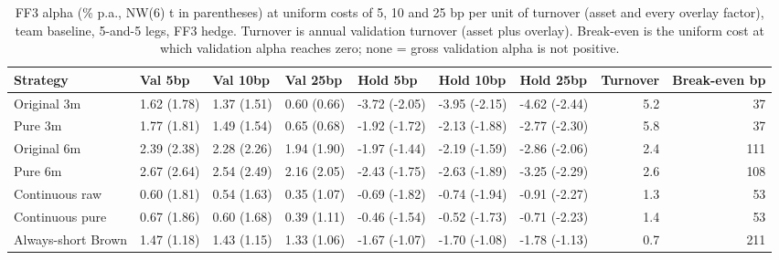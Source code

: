 \begin{table}
\caption{FF3 alpha (\% p.a., NW(6) t in parentheses) at uniform costs of 5, 10 and 25 bp per unit of turnover (asset and every overlay factor), team baseline, 5-and-5 legs, FF3 hedge. Turnover is annual validation turnover (asset plus overlay). Break-even is the uniform cost at which validation alpha reaches zero; none = gross validation alpha is not positive.}
\label{tab:m2_costs_team}
\begin{tabular}{lllllllrr}
\toprule
Strategy & Val 5bp & Val 10bp & Val 25bp & Hold 5bp & Hold 10bp & Hold 25bp & Turnover & Break-even bp \\
\midrule
Original 3m & 1.62 (1.78) & 1.37 (1.51) & 0.60 (0.66) & -3.72 (-2.05) & -3.95 (-2.15) & -4.62 (-2.44) & 5.2 & 37 \\
Pure 3m & 1.77 (1.81) & 1.49 (1.54) & 0.65 (0.68) & -1.92 (-1.72) & -2.13 (-1.88) & -2.77 (-2.30) & 5.8 & 37 \\
Original 6m & 2.39 (2.38) & 2.28 (2.26) & 1.94 (1.90) & -1.97 (-1.44) & -2.19 (-1.59) & -2.86 (-2.06) & 2.4 & 111 \\
Pure 6m & 2.67 (2.64) & 2.54 (2.49) & 2.16 (2.05) & -2.43 (-1.75) & -2.63 (-1.89) & -3.25 (-2.29) & 2.6 & 108 \\
Continuous raw & 0.60 (1.81) & 0.54 (1.63) & 0.35 (1.07) & -0.69 (-1.82) & -0.74 (-1.94) & -0.91 (-2.27) & 1.3 & 53 \\
Continuous pure & 0.67 (1.86) & 0.60 (1.68) & 0.39 (1.11) & -0.46 (-1.54) & -0.52 (-1.73) & -0.71 (-2.23) & 1.4 & 53 \\
Always-short Brown & 1.47 (1.18) & 1.43 (1.15) & 1.33 (1.06) & -1.67 (-1.07) & -1.70 (-1.08) & -1.78 (-1.13) & 0.7 & 211 \\
\bottomrule
\end{tabular}
\end{table}
